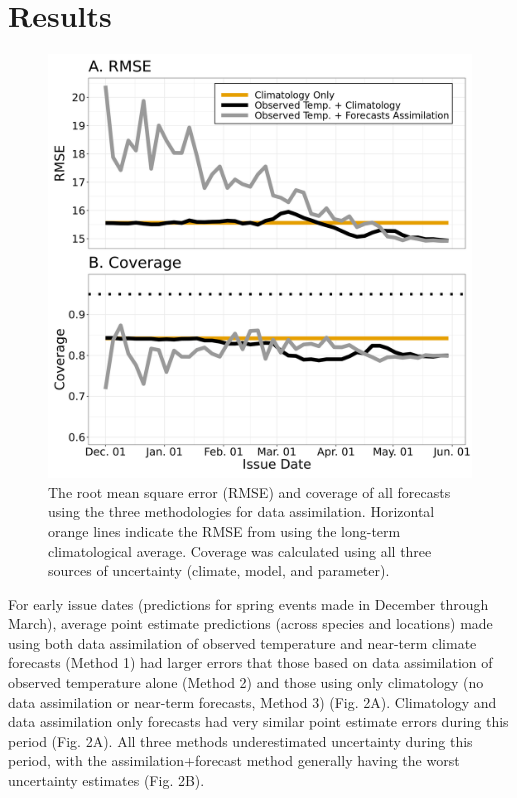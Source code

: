 \documentclass[fleqn,10pt,lineno]{wlpeerj}
\begin{document}
\section*{Results}

\begin{figure}[ht]
\centering
\includegraphics[width=\linewidth]{figs/fig2_avg_rmse_coverage.png}
\caption{The root mean square error (RMSE) and coverage of all forecasts using the three methodologies for data assimilation. Horizontal orange lines indicate the RMSE from using the long-term climatological average. Coverage was calculated using all three sources of uncertainty (climate, model, and parameter).}
\label{fig2}
\end{figure}

For early issue dates (predictions for spring events made in December through March), average point estimate predictions (across species and locations) made using both data assimilation of observed temperature and near-term climate forecasts (Method 1) had larger errors that those based on data assimilation of observed temperature alone (Method 2) and those using only climatology (no data assimilation or near-term forecasts, Method 3) (Fig. 2A). Climatology and data assimilation only forecasts had very similar point estimate errors during this period (Fig. 2A). All three methods underestimated uncertainty during this period, with the assimilation+forecast method generally having the worst uncertainty estimates (Fig. 2B). 
\end{document}
